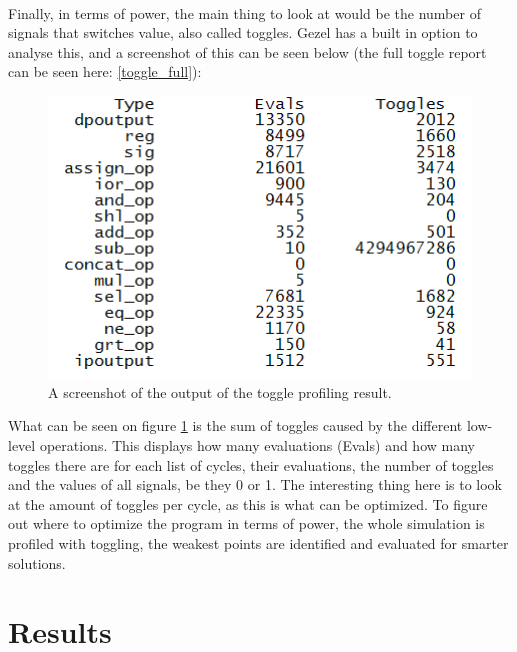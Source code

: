 \documentclass[12pt,a4paper]{article}
\begin{document}
	\\
	Finally, in terms of power, the main thing to look at would be the number of signals that switches value, also called toggles. Gezel has a built in option to analyse this, and a screenshot of this can be seen below (the full toggle report can be seen here: \ref{toggle_full}):\\
	\begin{figure}[h!]
		\centering
			\includegraphics[width=1\textwidth]{Screenshots/Screenshot_profiling.png}
		\caption{A screenshot of the output of the toggle profiling result.}
		\label{toggle}
	\end{figure}
	
	What can be seen on figure \ref{toggle} is the sum of toggles caused by the different low-level operations. This displays how many evaluations (Evals) and how many toggles there are for each 
	 list of cycles, their evaluations, the number of toggles and the values of all signals, be they 0 or 1. The interesting thing here is to look at the amount of toggles per cycle, as this is what can be optimized. To figure out where to optimize the program in terms of power, the whole simulation is profiled with toggling, the weakest points are identified and evaluated for smarter solutions.\\


\section{Results}
	
\end{document}
